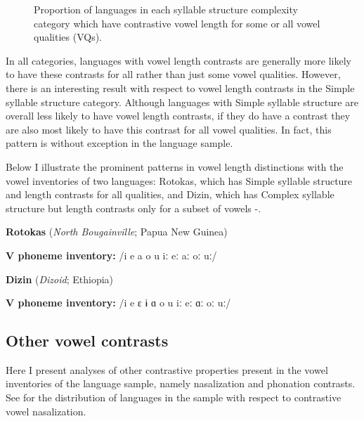 \begin{figure}
\caption{\label{fig:4.2} Proportion of languages in each syllable structure complexity category which have contrastive vowel length for some or all vowel qualities (VQs).}
\end{figure}

  In all categories, languages with vowel length contrasts are generally more likely to have these contrasts for all rather than just some vowel qualities. However, there is an interesting result with respect to vowel length contrasts in the Simple syllable structure category. Although languages with Simple syllable structure are overall less likely to have vowel length contrasts, if they do have a contrast they are also most likely to have this contrast for all vowel qualities. In fact, this pattern is without exception in the language sample.

  Below I illustrate the prominent patterns in vowel length distinctions with the vowel inventories of two languages: Rotokas, which has Simple syllable structure and length contrasts for all qualities, and Dizin, which has Complex syllable structure but length contrasts only for a subset of vowels -.

\ea\label{ex:4.13}
  \textbf{Rotokas} (\textit{North Bougainville}; Papua New Guinea)

\textbf{V phoneme inventory:} /i e a o u iː eː aː oː uː/
\z

\ea\label{ex:4.14}
  \textbf{Dizin} (\textit{Dizoid}; Ethiopia)

\textbf{V phoneme inventory:} /i e ɛ ɨ ɑ o u iː eː ɑː oː uː/
\z

\subsection{Other vowel contrasts}\label{sec:4.3.3}

  Here I present analyses of other contrastive properties present in the vowel inventories of the language sample, namely nasalization and phonation contrasts. See  for the distribution of languages in the sample with respect to contrastive vowel nasalization.

